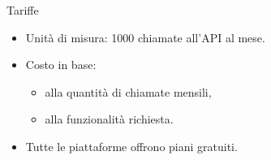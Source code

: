 %
\begin{frame}[t]{Tariffe}
	\begin{itemize}
		\item Unità di misura: 1000 chiamate all'API al mese.
		\item Costo in base:
		\begin{itemize}
			\item alla quantità di chiamate mensili,
			\item alla funzionalità richiesta.
		\end{itemize}
		\item Tutte le piattaforme offrono piani gratuiti.
	\end{itemize}
\end{frame}
%

